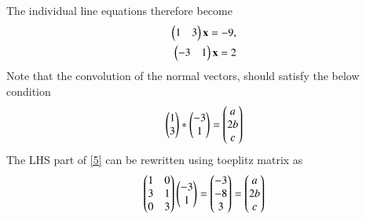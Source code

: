 \documentclass[journal,12pt,twocolumn]{IEEEtran}
\begin{document}
The individual line equations therefore become
\begin{align}
    \begin{pmatrix}1&3\end{pmatrix}\mathbf{x}=-9\label{3} ,\\\begin{pmatrix}-3&1\end{pmatrix}\mathbf{x}=2\label{4}
\end{align}
Note that the convolution of the normal vectors, should satisfy the below condition
\begin{align}
    \begin{pmatrix}1\\3\end{pmatrix}*\begin{pmatrix}-3\\1\end{pmatrix}=\begin{pmatrix}a\\2b\\c\end{pmatrix}\label{5}
\end{align}
The LHS part of \eqref{5} can be rewritten using toeplitz matrix as
\begin{align}
    \begin{pmatrix}1&0\\3&1\\0&3\end{pmatrix}\begin{pmatrix}-3\\1\end{pmatrix}=\begin{pmatrix}-3\\-8\\3\end{pmatrix}=\begin{pmatrix}a\\2b\\c\end{pmatrix}
\end{align}
\end{document}
